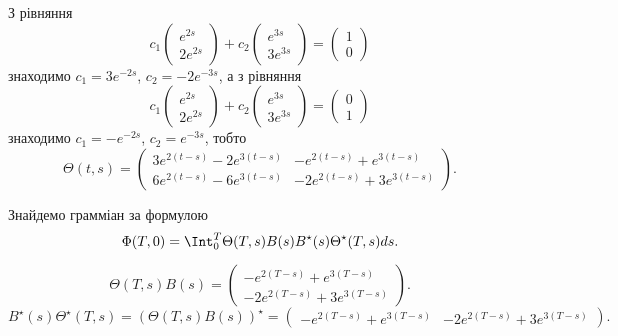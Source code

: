 \begin{solution}
    З рівняння
    \[c_1 \begin{pmatrix} e^{2s} \\ 2e^{2s} \end{pmatrix} + c_2 \begin{pmatrix} e^{3s} \\ 3e^{3s} \end{pmatrix} = \begin{pmatrix} 1 \\ 0 \end{pmatrix} \]
    знаходимо $c_1 = 3e^{-2s}$, $c_2 = -2e^{-3s}$, а з рівняння
    \[c_1 \begin{pmatrix} e^{2s} \\ 2e^{2s} \end{pmatrix} + c_2 \begin{pmatrix} e^{3s} \\ 3e^{3s} \end{pmatrix} = \begin{pmatrix} 0 \\ 1 \end{pmatrix} \]
    знаходимо $c_1 = -e^{-2s}$, $c_2 = e^{-3s}$, тобто
    \[ \Theta(t, s) = \begin{pmatrix} 3e^{2(t-s)} - 2e^{3(t-s)} & -e^{2(t-s)} + e^{3(t-s)} \\ 6e^{2(t-s)} - 6e^{3(t-s)} & -2e^{2(t-s)} + 3e^{3(t-s)} \end{pmatrix}. \]
    
    Знайдемо грамміан за формулою \[\Phi(T, 0) = \Int_0^T \Theta(T, s) B(s) B^\star (s) \Theta^\star(T, s) ds. \]
    
    \[ \Theta(T, s) B(s) = \begin{pmatrix} -e^{2(T - s)} + e^{3(T - s)} \\ -2e^{2(T - s)} + 3e^{3(T - s)} \end{pmatrix}. \]
    \[ B^\star (s) \Theta^\star(T, s)  =  (\Theta(T, s) B(s))^\star = \begin{pmatrix} -e^{2(T - s)} + e^{3(T - s)} & -2e^{2(T - s)} + 3e^{3(T - s)} \end{pmatrix}. \]
    

\end{solution}

